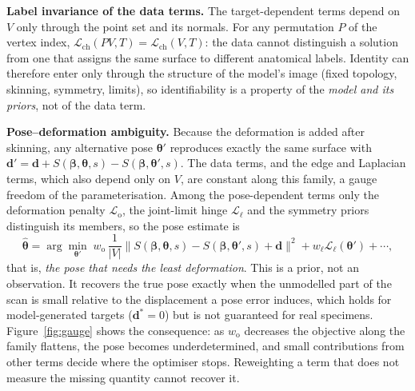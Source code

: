 \textbf{Label invariance of the data terms.} The target-dependent terms depend on
$V$ only through the point set and its normals. For any permutation $P$ of the
vertex index, $\mathcal L_{\mathrm{ch}}(PV,T)=\mathcal L_{\mathrm{ch}}(V,T)$: the
data cannot distinguish a solution from one that assigns the same surface to
different anatomical labels. Identity can therefore enter only through the
structure of the model's image (fixed topology, skinning, symmetry, limits), so
identifiability is a property of the \emph{model and its priors}, not of the
data term.

\textbf{Pose--deformation ambiguity.} Because the deformation is added after
skinning, any alternative pose $\bm\theta'$ reproduces exactly the same surface
with $\mathbf d'=\mathbf d+S(\bm\beta,\bm\theta,s)-S(\bm\beta,\bm\theta',s)$. The
data terms, and the edge and Laplacian terms, which also depend only on $V$, are
constant along this family, a gauge freedom of the parameterisation. Among the pose-dependent terms only the deformation
penalty $\mathcal L_{\mathrm o}$, the joint-limit hinge $\mathcal L_{\ell}$ and the
symmetry priors distinguish its members, so the pose estimate is
\begin{equation}
\hat{\bm\theta}=\arg\min_{\bm\theta'}\;w_{\mathrm o}\,\frac1{|V|}\big\|S(\bm\beta,\bm\theta,s)-S(\bm\beta,\bm\theta',s)+\mathbf d\big\|^2+w_{\ell}\mathcal L_{\ell}(\bm\theta')+\cdots,
\label{eq:gauge}
\end{equation}
that is, \emph{the pose that needs the least deformation}. This is a prior, not
an observation. It recovers the true pose exactly when the unmodelled part of the
scan is small relative to the displacement a pose error induces, which holds for
model-generated targets ($\mathbf d^\ast=0$) but is not guaranteed for real
specimens. Figure~\ref{fig:gauge} shows the consequence: as $w_{\mathrm o}$
decreases the objective along the family flattens, the pose becomes
underdetermined, and small contributions from other terms decide where the
optimiser stops. Reweighting a term that does not measure the missing quantity
cannot recover it.


